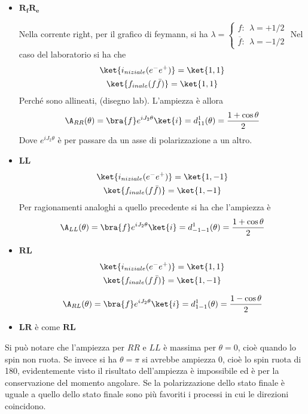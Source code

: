 \documentclass[12pt]{book}
\begin{document}
\begin{itemize}
	\item $\mathbf{R_f R_e}$
	
	Nella corrente right, per il grafico di feymann, si ha $\lambda = \begin{cases}
 f: \ \ \lambda=+1/2	\\ \overline f: \ \ \lambda = - 1/2
 \end{cases}
$
Nel caso del laboratorio si ha che 
\begin{gather}
\ket{i_{niziale} (e^-e^+)} = \ket{1,1}\\
\ket{f_{inale} (f \bar f)} = \ket{1,1}	
\end{gather}
Perché sono allineati, (disegno lab). L'ampiezza è allora
\begin{gather}
	\A_{RR} (\theta) = \bra{f} e^{i J_2 \theta} \ket{i}= d_{11}^1 (\theta) = \frac{1+\cos \theta}{2}
\end{gather}
Dove $e^{i J_2 \theta}$ è per passare da un asse di polarizzazione a un altro.
\item $\mathbf{LL}$

\begin{gather}
\ket{i_{niziale} (e^-e^+)} = \ket{1,-1}\\
\ket{f_{inale} (f \bar f)} = \ket{1,-1}	
\end{gather}
Per ragionamenti analoghi a quello precedente si ha che l'ampiezza è 
\begin{gather}
	\A_{LL} (\theta) = \bra{f} e^{i J_2 \theta} \ket{i}= d_{-1-1}^1 (\theta) = \frac{1+\cos \theta}{2}
\end{gather}

\item $\mathbf{RL}$

\begin{gather}
\ket{i_{niziale} (e^-e^+)} = \ket{1,1}\\
\ket{f_{inale} (f \bar f)} = \ket{1,-1}	
\end{gather}

\begin{gather}
	\A_{RL} (\theta) = \bra{f} e^{i J_2 \theta} \ket{i}= d_{1-1}^1 (\theta) = \frac{1-\cos \theta}{2}
\end{gather}

\item $\mathbf{LR}$ è come $\mathbf{RL}$
\end{itemize}

Si può notare che l'ampiezza per $RR$ e $LL$ è massima per $\theta=0$, cioè quando lo spin non ruota. Se invece si ha $\theta= \pi$ si avrebbe ampiezza 0, cioè lo spin ruota di 180, evidentemente visto il risultato dell'ampiezza è impossibile ed è per la conservazione del momento angolare. Se la polarizzazione dello stato finale è uguale  a quello dello stato finale sono più favoriti i processi in cui le direzioni coincidono. 
\end{document}
